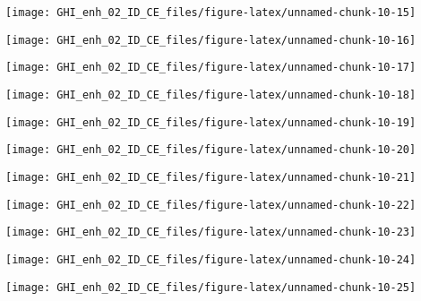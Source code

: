 \documentclass[
  10pt,
  a4paper,oneside]{article}
\begin{document}
\begin{center}\texttt{[image: GHI\_enh\_02\_ID\_CE\_files/figure-latex/unnamed-chunk-10-15]} \end{center}

\begin{center}\texttt{[image: GHI\_enh\_02\_ID\_CE\_files/figure-latex/unnamed-chunk-10-16]} \end{center}

\begin{center}\texttt{[image: GHI\_enh\_02\_ID\_CE\_files/figure-latex/unnamed-chunk-10-17]} \end{center}

\begin{center}\texttt{[image: GHI\_enh\_02\_ID\_CE\_files/figure-latex/unnamed-chunk-10-18]} \end{center}

\begin{center}\texttt{[image: GHI\_enh\_02\_ID\_CE\_files/figure-latex/unnamed-chunk-10-19]} \end{center}

\begin{center}\texttt{[image: GHI\_enh\_02\_ID\_CE\_files/figure-latex/unnamed-chunk-10-20]} \end{center}

\begin{center}\texttt{[image: GHI\_enh\_02\_ID\_CE\_files/figure-latex/unnamed-chunk-10-21]} \end{center}

\begin{center}\texttt{[image: GHI\_enh\_02\_ID\_CE\_files/figure-latex/unnamed-chunk-10-22]} \end{center}

\begin{center}\texttt{[image: GHI\_enh\_02\_ID\_CE\_files/figure-latex/unnamed-chunk-10-23]} \end{center}

\begin{center}\texttt{[image: GHI\_enh\_02\_ID\_CE\_files/figure-latex/unnamed-chunk-10-24]} \end{center}

\begin{center}\texttt{[image: GHI\_enh\_02\_ID\_CE\_files/figure-latex/unnamed-chunk-10-25]} \end{center}
\end{document}
